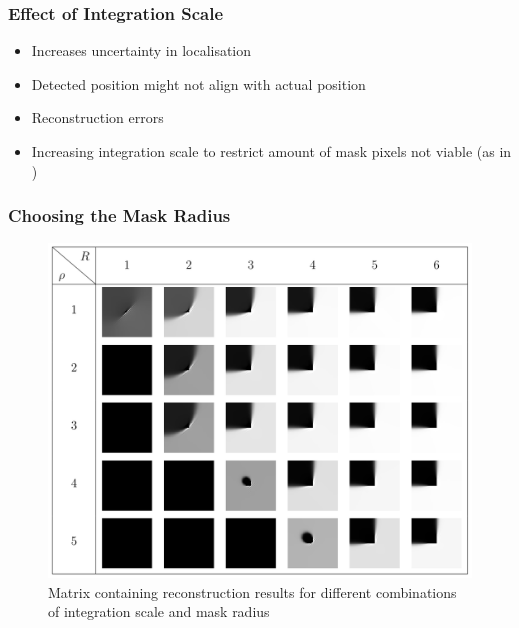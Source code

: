 \documentclass{beamer}
\begin{document}
    \begin{frame}[t]
        \frametitle{Effect of Integration Scale}
         {\begin{itemize}
            \item<+-|alert@+> Increases uncertainty in localisation
            \item<+-|alert@+> Detected position might not align with actual position
            \item<4-|alert@4> Reconstruction errors 
            \item<5-|alert@5> Increasing integration scale to restrict amount of mask pixels not viable (as in
                \cite{zimmer07})
    \end{itemize}}
    \end{frame}

    \begin{frame}[t]
        \frametitle{Choosing the Mask Radius}
        \begin{figure}[htpb]
            \centering
            \includegraphics[width=0.7\linewidth]{images/matrix_inpaint.png}
            \caption{Matrix containing reconstruction results for different combinations of
            integration scale and mask radius}
        \end{figure} 
    \end{frame}
\end{document}
